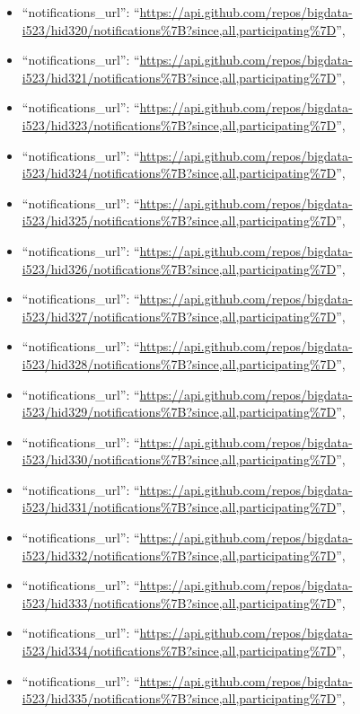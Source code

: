 \begin{itemize}
\item
  ``notifications\_url'':
  ``\url{https://api.github.com/repos/bigdata-i523/hid320/notifications\%7B?since,all,participating\%7D}'',
\item
  ``notifications\_url'':
  ``\url{https://api.github.com/repos/bigdata-i523/hid321/notifications\%7B?since,all,participating\%7D}'',
\item
  ``notifications\_url'':
  ``\url{https://api.github.com/repos/bigdata-i523/hid323/notifications\%7B?since,all,participating\%7D}'',
\item
  ``notifications\_url'':
  ``\url{https://api.github.com/repos/bigdata-i523/hid324/notifications\%7B?since,all,participating\%7D}'',
\item
  ``notifications\_url'':
  ``\url{https://api.github.com/repos/bigdata-i523/hid325/notifications\%7B?since,all,participating\%7D}'',
\item
  ``notifications\_url'':
  ``\url{https://api.github.com/repos/bigdata-i523/hid326/notifications\%7B?since,all,participating\%7D}'',
\item
  ``notifications\_url'':
  ``\url{https://api.github.com/repos/bigdata-i523/hid327/notifications\%7B?since,all,participating\%7D}'',
\item
  ``notifications\_url'':
  ``\url{https://api.github.com/repos/bigdata-i523/hid328/notifications\%7B?since,all,participating\%7D}'',
\item
  ``notifications\_url'':
  ``\url{https://api.github.com/repos/bigdata-i523/hid329/notifications\%7B?since,all,participating\%7D}'',
\item
  ``notifications\_url'':
  ``\url{https://api.github.com/repos/bigdata-i523/hid330/notifications\%7B?since,all,participating\%7D}'',
\item
  ``notifications\_url'':
  ``\url{https://api.github.com/repos/bigdata-i523/hid331/notifications\%7B?since,all,participating\%7D}'',
\item
  ``notifications\_url'':
  ``\url{https://api.github.com/repos/bigdata-i523/hid332/notifications\%7B?since,all,participating\%7D}'',
\item
  ``notifications\_url'':
  ``\url{https://api.github.com/repos/bigdata-i523/hid333/notifications\%7B?since,all,participating\%7D}'',
\item
  ``notifications\_url'':
  ``\url{https://api.github.com/repos/bigdata-i523/hid334/notifications\%7B?since,all,participating\%7D}'',
\item
  ``notifications\_url'':
  ``\url{https://api.github.com/repos/bigdata-i523/hid335/notifications\%7B?since,all,participating\%7D}'',

\end{itemize}
